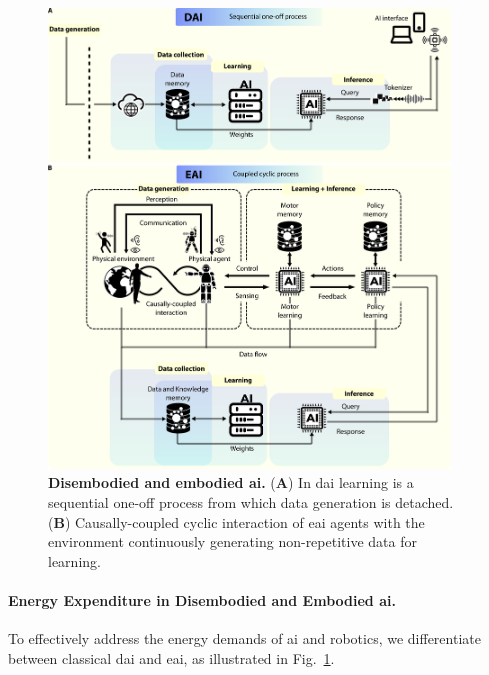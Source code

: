 \documentclass[12pt]{article}
\begin{document}
\begin{figure}[t!]
	\centering
	\hspace*{\fill}
	\includegraphics[width=0.95\textwidth]{eai_and_dai_concept_figure.png}
	\hspace*{\fill}
	\caption[] {\label{fig:eai_and_dai_concept_figure} \textbf{Disembodied and embodied \ac{ai}.} (\textbf{A}) In \ac{dai} learning is a sequential one-off process from which data generation is detached. (\textbf{B}) Causally-coupled cyclic interaction of \ac{eai} agents with the environment continuously generating non-repetitive data for learning.}
	
\end{figure}

\paragraph*{Energy Expenditure in Disembodied and Embodied \ac{ai}.} To effectively address the energy demands of \ac{ai} and robotics, we differentiate between classical \acl{dai} and \acl{eai}, as illustrated in Fig.~\ref{fig:eai_and_dai_concept_figure}.
\end{document}
